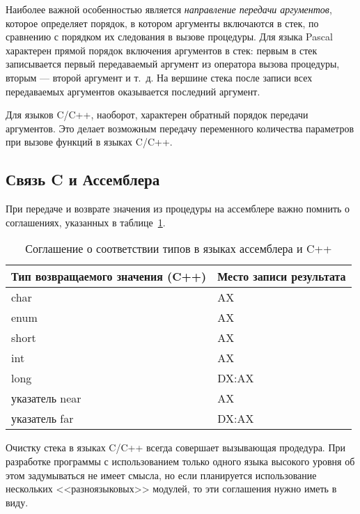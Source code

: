 Наиболее важной особенностью является \textit{направление передачи аргументов}, которое
определяет порядок, в котором аргументы включаются в стек, по сравнению с порядком
их следования в вызове процедуры. Для языка Pascal характерен прямой порядок включения
аргументов в стек: первым в стек записывается первый передаваемый аргумент из
оператора вызова процедуры, вторым --- второй аргумент и т.~д. На вершине стека
после записи всех передаваемых аргументов оказывается последний аргумент.

Для языков C/C++, наоборот, характерен обратный порядок передачи аргументов.
Это делает возможным передачу переменного количества параметров при вызове функций
в языках C/C++.


\subsection{Связь C и Ассемблера}

При передаче и возврате значения из процедуры на ассемблере важно помнить о
соглашениях, указанных в таблице~\ref{tbl:convention}.

\begin{table}[h!]
  \caption{Соглашение о соответствии типов в языках ассемблера и C++}
  \label{tbl:convention}
    \centering
    \small{
    \begin{tabular}{| p{} | p{} |}
      \hline

      Тип возвращаемого значения (C++) & Место записи результата \\ \hline
      [unsigned] char & AX \\ \hline
      enum & AX \\ \hline
      [unsigned] short & AX \\ \hline
      [unsigned] int & AX \\ \hline
      [unsigned] long & DX:AX \\ \hline
      указатель near & AX \\ \hline
      указатель far & DX:AX \\

      \hline
    \end{tabular}
    }
\end{table}

Очистку стека в языках C/C++ всегда совершает вызывающая продедура. При разработке
программы с использованием только одного языка высокого уровня об этом задумываться
не имеет смысла, но если планируется использование нескольких <<разноязыковых>>
модулей, то эти соглашения нужно иметь в виду.

